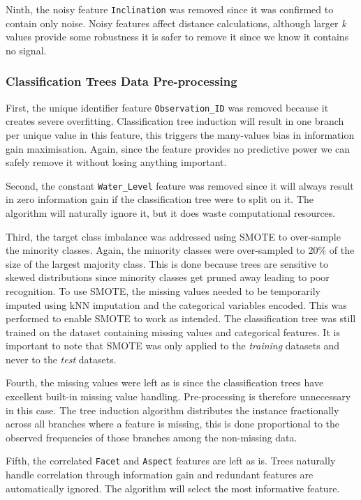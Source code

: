 \documentclass[10pt, conference]{IEEEtran}
\begin{document}
 Ninth, the noisy feature \texttt{Inclination} was removed since it was confirmed to contain only noise. Noisy features affect distance calculations, although larger \textit{k} values provide some robustness it is safer to remove it since we know it contains no signal.

\subsubsection{Classification Trees Data Pre-processing}

First, the unique identifier feature \texttt{Observation\_ID} was removed because it creates severe overfitting. Classification tree induction will result in one branch per unique value in this feature, this triggers the many-values bias in information gain maximisation. Again, since the feature provides no predictive power we can safely remove it without losing anything important.

Second, the constant \texttt{Water\_Level} feature was removed since it will always result in zero information gain if the classification tree were to split on it. The algorithm will naturally ignore it, but it does waste computational resources.

Third, the target class imbalance was addressed using SMOTE to over-sample the minority classes. Again, the minority classes were over-sampled to 20\% of the size of the largest majority class. This is done because trees are sensitive to skewed distributions since minority classes get pruned away leading to poor recognition. To use SMOTE, the missing values needed to be temporarily imputed using kNN imputation and the categorical variables encoded. This was performed to enable SMOTE to work as intended. The classification tree was still trained on the dataset containing missing values and categorical features. It is important to note that SMOTE was only applied to the \textit{training} datasets and never to the \textit{test} datasets.

Fourth, the missing values were left as is since the classification trees have excellent built-in missing value handling. Pre-processing is therefore unnecessary in this case. The tree induction algorithm distributes the instance fractionally across all branches where a feature is missing, this is done proportional to the observed frequencies of those branches among the non-missing data.

Fifth, the correlated \texttt{Facet} and \texttt{Aspect} features are left as is. Trees naturally handle correlation through information gain and redundant features are automatically ignored. The algorithm will select the most informative feature.
\end{document}
